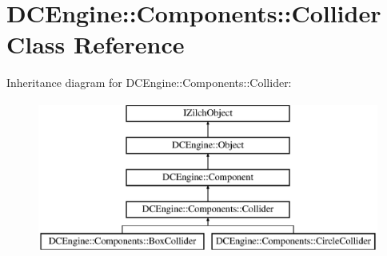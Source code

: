 \hypertarget{classDCEngine_1_1Components_1_1Collider}{\section{D\-C\-Engine\-:\-:Components\-:\-:Collider Class Reference}
\label{classDCEngine_1_1Components_1_1Collider}
}
Inheritance diagram for D\-C\-Engine\-:\-:Components\-:\-:Collider\-:\begin{figure}[H]
\begin{center}
\leavevmode
\includegraphics[height=5.000000cm]{classDCEngine_1_1Components_1_1Collider}
\end{center}
\end{figure}
